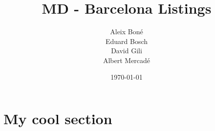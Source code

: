 

\title{MD - \airbnb Barcelona Listings}
\author{
    Aleix Bon\'e\\
    Eduard Bosch\\
    David Gili\\
    Albert Mercad\'e\\
}
\date{\today}






\setcounter{tocdepth}{2}
\tableofcontents
\clearpage

\section{My cool section}



